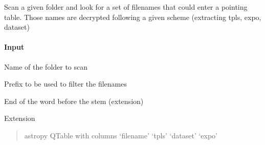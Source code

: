 \documentclass[letterpaper,10pt,english]{sphinxmanual}
\begin{document}

\begin{fulllineitems}
\label{\detokenize{api/pymusepipe:pymusepipe.util_image.scan_filenames_from_folder}}
\pysigstartsignatures
{}
\pysigstopsignatures
\sphinxAtStartPar
Scan a given folder and look for a set of filenames that could enter a pointing
table. Those names are decrypted following a given scheme (extracting tpls, expo, dataset)


\paragraph{Input}
\label{\detokenize{api/pymusepipe:id155}}\begin{description}
\sphinxAtStartPar
Name of the folder to scan

\sphinxAtStartPar
Prefix to be used to filter the filenames

\sphinxAtStartPar
End of the word before the stem (extension)

\sphinxAtStartPar
Extension

\end{description}
\begin{quote}\begin{description}
\sphinxAtStartPar
{}

\sphinxAtStartPar
astropy QTable with columns ‘filename’ ‘tpls’ ‘dataset’ ‘expo’

\end{description}\end{quote}

\end{fulllineitems}
\end{document}
